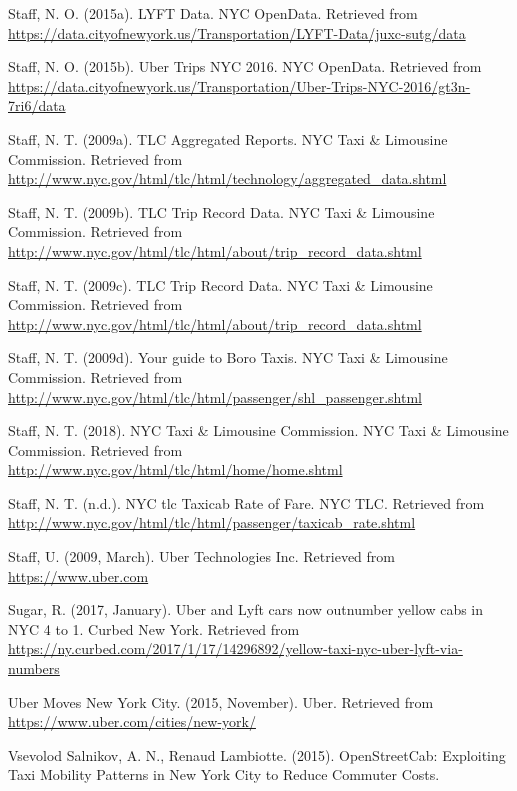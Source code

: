 \documentclass[12pt,twoside]{reedthesis}
\theoremstyle{definition}
\theoremstyle{definition}
\theoremstyle{definition}
\theoremstyle{remark}
\begin{document}
\hypertarget{ref-datalyft}{}
Staff, N. O. (2015a). LYFT Data. NYC OpenData. Retrieved from
\url{https://data.cityofnewyork.us/Transportation/LYFT-Data/juxc-sutg/data}

\hypertarget{ref-datauberweek}{}
Staff, N. O. (2015b). Uber Trips NYC 2016. NYC OpenData. Retrieved from
\url{https://data.cityofnewyork.us/Transportation/Uber-Trips-NYC-2016/gt3n-7ri6/data}

\hypertarget{ref-datayellowmonth}{}
Staff, N. T. (2009a). TLC Aggregated Reports. NYC Taxi \& Limousine
Commission. Retrieved from
\url{http://www.nyc.gov/html/tlc/html/technology/aggregated_data.shtml}

\hypertarget{ref-datayellow}{}
Staff, N. T. (2009b). TLC Trip Record Data. NYC Taxi \& Limousine
Commission. Retrieved from
\url{http://www.nyc.gov/html/tlc/html/about/trip_record_data.shtml}

\hypertarget{ref-datauber}{}
Staff, N. T. (2009c). TLC Trip Record Data. NYC Taxi \& Limousine
Commission. Retrieved from
\url{http://www.nyc.gov/html/tlc/html/about/trip_record_data.shtml}

\hypertarget{ref-greentaxi}{}
Staff, N. T. (2009d). Your guide to Boro Taxis. NYC Taxi \& Limousine
Commission. Retrieved from
\url{http://www.nyc.gov/html/tlc/html/passenger/shl_passenger.shtml}

\hypertarget{ref-nyctlc}{}
Staff, N. T. (2018). NYC Taxi \& Limousine Commission. NYC Taxi \&
Limousine Commission. Retrieved from
\url{http://www.nyc.gov/html/tlc/html/home/home.shtml}

\hypertarget{ref-tlcfarerate}{}
Staff, N. T. (n.d.). NYC tlc Taxicab Rate of Fare. NYC TLC. Retrieved
from \url{http://www.nyc.gov/html/tlc/html/passenger/taxicab_rate.shtml}

\hypertarget{ref-uberweb}{}
Staff, U. (2009, March). Uber Technologies Inc. Retrieved from
\url{https://www.uber.com}

\hypertarget{ref-sugar2017}{}
Sugar, R. (2017, January). Uber and Lyft cars now outnumber yellow cabs
in NYC 4 to 1. Curbed New York. Retrieved from
\url{https://ny.curbed.com/2017/1/17/14296892/yellow-taxi-nyc-uber-lyft-via-numbers}

\hypertarget{ref-ubernyc}{}
Uber Moves New York City. (2015, November). Uber. Retrieved from
\url{https://www.uber.com/cities/new-york/}

\hypertarget{ref-guerrini2015}{}
Vsevolod Salnikov, A. N., Renaud Lambiotte. (2015). OpenStreetCab:
Exploiting Taxi Mobility Patterns in New York City to Reduce Commuter
Costs.
\end{document}
